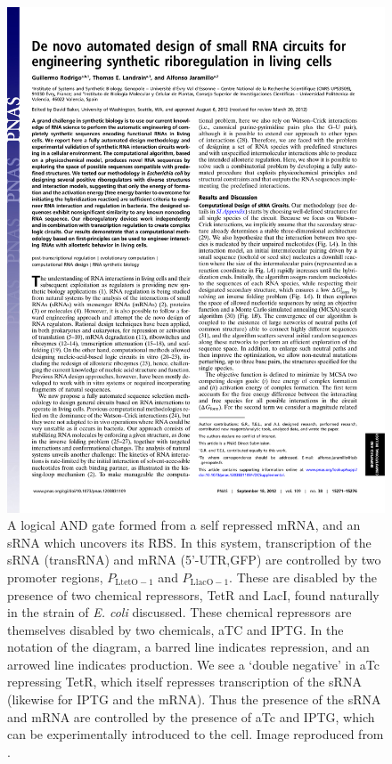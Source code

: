 \documentclass[10pt,journal]{./IEEE_latex_class/IEEEtran}
\begin{document}
\begin{figure}[t!]
\centering
\includegraphics[trim = 30 600 30 0,page=4,clip = true]{pnas1203831109.pdf}
\caption{A logical AND gate formed from a self repressed mRNA, and an sRNA which uncovers its RBS. In this system, transcription of the sRNA (transRNA) and mRNA (5'-UTR,GFP) are controlled by two promoter regions, $P_{\mathrm{LtetO-1}}$ and $P_\mathrm{LlacO-1}$. These are disabled by the presence of two chemical repressors, TetR and LacI, found naturally in the strain of \textit{E. coli} discussed. These chemical repressors are themselves disabled by two chemicals, aTC and IPTG. In the notation of the diagram, a barred line indicates repression, and an arrowed line indicates production. We see a `double negative' in aTc repressing TetR, which itself represses transcription of the sRNA (likewise for IPTG and the mRNA). Thus the presence of the sRNA and mRNA are controlled by the presence of aTc and IPTG, which can be experimentally introduced to the cell.  Image reproduced from \cite{Rodrigo2012}.}
\label{ANDGate}
\end{figure}
\end{document}
